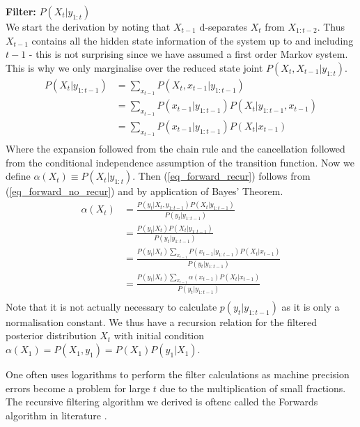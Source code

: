 \documentclass[../masters.tex]{subfiles}
\begin{document}
\textbf{Filter:} $P(X_t|y_{1:t})$\\
We start the derivation by noting that $X_{t-1}$ d-separates $X_t$ from $X_{1:t-2}$. Thus $X_{t-1}$ contains all the hidden state information of the system up to and including $t-1$ - this is not surprising since we have assumed a first order Markov system. This is why we only marginalise over the reduced state joint $P(X_t, X_{t-1}|y_{1:t})$.
\begin{equation}
\begin{aligned}
P(X_t| y_{1:t-1}) &= \sum_{x_{t-1}} P(X_t, x_{t-1}| y_{1:t-1})\\
&= \sum_{x_{t-1}} P(x_{t-1}|y_{1:t-1})P(X_t|y_{1:t-1}, x_{t-1})\\  
& = \sum_{x_{t-1}} P(x_{t-1}|y_{1:t-1})P(X_t|x_{t-1}) \\
\end{aligned}
\label{eq_forward_no_recur}
\end{equation}
Where the expansion followed from the chain rule and the cancellation followed from the conditional independence assumption of the transition function. Now we define $\alpha(X_t) \equiv P(X_t | y_{1:t})$. Then (\ref{eq_forward_recur}) follows from (\ref{eq_forward_no_recur}) and by application of Bayes' Theorem.
\begin{equation}
\begin{aligned}
\alpha(X_t) &= \frac{P(y_t|X_t, y_{1:t-1})P(X_t|y_{1:t-1})}{P(y_t|y_{1:t-1})} \\
& = \frac{P(y_t|X_t)P(X_t|y_{1:t-1})}{P(y_t|y_{1:t-1})} \\
& = \frac{P(y_t|X_t) \sum_{x_{t-1}} P(x_{t-1}|y_{1:t-1})P(X_t|x_{t-1})}{P(y_t|y_{1:t-1})} \\
& = \frac{P(y_t|X_t) \sum_{x_{t-1}} \alpha(x_{t-1})P(X_t|x_{t-1})}{P(y_t|y_{1:t-1})} \\
\end{aligned}
\label{eq_forward_recur}
\end{equation}
Note that it is not actually necessary to calculate $p(y_t|y_{1:t-1})$ as it is only a normalisation constant. We thus have a recursion relation for the filtered posterior distribution $X_t$ with initial condition $\alpha(X_1) = P(X_1, y_1) = P(X_1)P(y_1|X_1)$.

One often uses logarithms to perform the filter calculations as machine precision errors become a problem for large $t$ due to the multiplication of small fractions. The recursive filtering algorithm we derived is oftenc called the Forwards algorithm in literature \cite{barber}.
\end{document}
